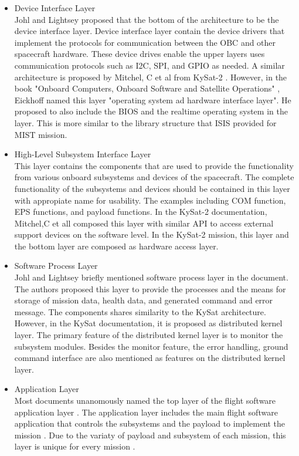 \documentclass[a4paper]{article}
\begin{document}
\begin{itemize} 
    
    \item Device Interface Layer \\
    Johl and Lightsey proposed that the bottom of the architecture to be the device interface layer. Device interface layer contain the device drivers that implement the protocols for communication between the OBC and other spacecraft hardware. These device drives enable the upper layers uses communication protocols such as I2C, SPI, and GPIO as needed. A similar architecture is proposed by Mitchel, C et al from KySat-2 \cite{KySat-2}. However, in the book "Onboard Computers, Onboard Software and Satellite Operations" \cite{obc-book}, Eickhoff named this layer "operating system ad hardware interface layer". He proposed to also include the BIOS and the realtime operating system in the layer. This is more similar to the library structure that ISIS provided for MIST mission. 
    
    \item High-Level Subsystem Interface Layer \\
    This layer contains the components that are used to provide the functionality from various onboard subsystems and devices of the spacecraft. The complete functionality of the subsystems and devices should be contained in this layer with appropiate name for usability. The examples including COM function, EPS functions, and payload functions. In the KySat-2 documentation, Mitchel,C et all composed this layer with similar API to access external support devices on the software level. In the KySat-2 mission, this layer and the bottom layer are composed as hardware access layer. 
    
    \item Software Process Layer \\
    Johl and Lightsey briefly mentioned software process layer in the document. The authors proposed this layer to provide the processes and the means for storage of mission data, health data, and generated command and error message. The components shares similarity to the KySat architecture. However, in the KySat documentation, it is proposed as distributed kernel layer. The primary feature of the distributed kernel layer is to monitor the subsystem modules. Besides the monitor feature, the error handling, ground command interface are also mentioned as features on the distributed kernel layer.
    
    \item Application Layer\\
    Most documents unanomously named the top layer of the flight software application layer \cite{Addaim2010-ym}\cite{compass-1}\cite{Greg_D_Manyak2011-xr}\cite{cadh-architecture}\cite{KySat-2}\cite{reusable-cadh}\cite{obc-book}. The application layer includes the main flight software application that controls the subsystems and the payload to implement the mission \cite{KySat-2}\cite{obc-book}. Due to the variaty of payload and subsystem of each mission, this layer is unique for every mission \cite{reusable-cadh}.  
    
    
\end{itemize}
\end{document}
